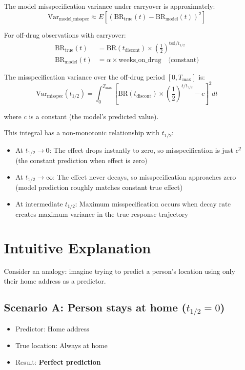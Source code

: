 \documentclass[11pt,a4paper]{article}
\begin{document}
The model misspecification variance under carryover is approximately:
\begin{equation}
\text{Var}_{\text{model\_misspec}} \approx E\left[(\text{BR}_{\text{true}}(t) - \text{BR}_{\text{model}}(t))^2\right]
\end{equation}

For off-drug observations with carryover:
\begin{align}
\text{BR}_{\text{true}}(t) &= \text{BR}(t_{\text{discont}}) \times \left(\frac{1}{2}\right)^{\text{tsd}/t_{1/2}} \\
\text{BR}_{\text{model}}(t) &= \alpha \times \text{weeks\_on\_drug} \quad \text{(constant)}
\end{align}

The misspecification variance over the off-drug period $[0, T_{\max}]$ is:
\begin{equation}
\text{Var}_{\text{misspec}}(t_{1/2}) = \int_0^{T_{\max}} \left[\text{BR}(t_{\text{discont}}) \times \left(\frac{1}{2}\right)^{t/t_{1/2}} - c\right]^2 dt
\end{equation}

where $c$ is a constant (the model's predicted value).

This integral has a non-monotonic relationship with $t_{1/2}$:
\begin{itemize}
    \item At $t_{1/2} \to 0$: The effect drops instantly to zero, so misspecification is
          just $c^2$ (the constant prediction when effect is zero)
    \item At $t_{1/2} \to \infty$: The effect never decays, so misspecification approaches zero
          (model prediction roughly matches constant true effect)
    \item At intermediate $t_{1/2}$: Maximum misspecification occurs when decay rate creates
          maximum variance in the true response trajectory
\end{itemize}

\section{Intuitive Explanation}

Consider an analogy: imagine trying to predict a person's location using only
their home address as a predictor.

\subsection{Scenario A: Person stays at home ($t_{1/2} = 0$)}
\begin{itemize}
    \item Predictor: Home address
    \item True location: Always at home
    \item Result: \textbf{Perfect prediction}
\end{itemize}
\end{document}
